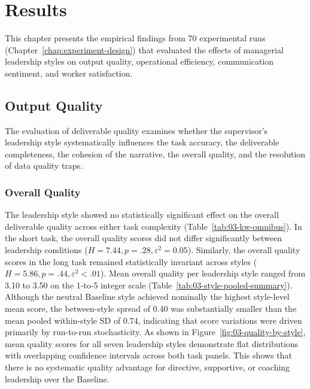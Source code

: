 \chapter{Results}
\label{chap:results}

This chapter presents the empirical findings from 70 experimental runs (Chapter~\ref{chap:experiment-design}) that evaluated the effects of managerial leadership styles on output quality, operational efficiency, communication sentiment, and worker satisfaction.

\section{Output Quality}
\label{sec:results-output-quality}

The evaluation of deliverable quality examines whether the supervisor's leadership style systematically influences the task accuracy, the deliverable completeness, the cohesion of the narrative, the overall quality, and the resolution of data quality traps.

\subsection{Overall Quality}
\label{subsec:overall-quality}

The leadership style showed no statistically significant effect on the overall deliverable quality across either task complexity (Table~\ref{tab:03-kw-omnibus}).
In the short task, the overall quality scores did not differ significantly between leadership conditions ($H = 7.44, p = .28, \varepsilon^2 = 0.05$).
Similarly, the overall quality scores in the long task remained statistically invariant across styles ($H = 5.86, p = .44, \varepsilon^2 < .01$).
Mean overall quality per leadership style ranged from 3.10 to 3.50 on the 1-to-5 integer scale (Table~\ref{tab:03-style-pooled-summary}).
Although the neutral Baseline style achieved nominally the highest style-level mean score, the between-style spread of 0.40 was substantially smaller than the mean pooled within-style \ac{SD} of 0.74, indicating that score variations were driven primarily by run-to-run stochasticity.
As shown in Figure~\ref{fig:03-quality-by-style}, mean quality scores for all seven leadership styles demonstrate flat distributions with overlapping confidence intervals across both task panels.
This shows that there is no systematic quality advantage for directive, supportive, or coaching leadership over the Baseline.

